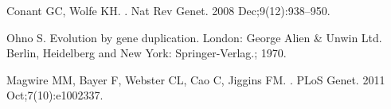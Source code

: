 \documentclass[10pt,letterpaper]{article}
\begin{document}
\nolinenumbers

%
%
% 
\begin{thebibliography}{10}

Conant GC, Wolfe KH.
.
\newblock Nat Rev Genet. 2008 Dec;9(12):938--950.

Ohno S.
\newblock Evolution by gene duplication.
\newblock London: George Alien \& Unwin Ltd. Berlin, Heidelberg and New York:
  Springer-Verlag.; 1970.

Magwire MM, Bayer F, Webster CL, Cao C, Jiggins FM.
.
\newblock PLoS Genet. 2011 Oct;7(10):e1002337.

\end{thebibliography}
\end{document}
